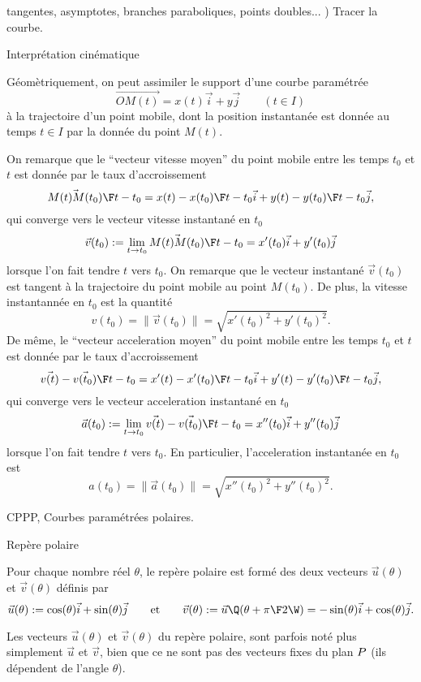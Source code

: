 \noindent\quad tangentes, asymptotes, branches paraboliques, points doubles...
\medskip
{}) Tracer la courbe.

\bigskip
\Concept [] Interpr\'etation cin\'ematique

\noindent
G\'eom\`etriquement, on peut assimiler le support d'une courbe param\'etr\'ee
$$
\vec{OM(t)}=x(t)\vec i+y\vec j\qquad(t\in I)
$$
\`a la trajectoire d'un point mobile, dont la position instantan\'ee est donn\'ee au temps $t\in I$ par la donn\'ee du point $M(t)$. 

\bigskip
\noindent
On remarque que le ``vecteur vitesse moyen'' du point mobile entre les temps $t_0$ et $t$ est donn\'ee par le taux d'accroissement 
$$
{\vec{M(t)M(t_0)}\F t-t_0}={x(t)-x(t_0)\F t-t_0}\vec i+{y(t)-y(t_0)\F t-t_0}\vec j, 
$$
qui converge vers le vecteur vitesse instantan\'e en $t_0$ 
$$
\vec v(t_0):=\lim_{t\to t_0}{\vec{M(t)M(t_0)}\F t-t_0}=x'(t_0)\vec i+y'(t_0)\vec j 
$$
lorsque l'on fait tendre $t$ vers $t_0$. \medskip
\noindent
On remarque que le vecteur instantan\'e $\vec v(t_0)$ est tangent \`a la trajectoire du point mobile au point $M(t_0)$. 
De plus, la vitesse instantann\'ee en $t_0$ est la quantit\'e 
$$
v(t_0)=\|\vec v(t_0)\|=\sqrt{x'(t_0)^2+y'(t_0)^2}.
$$
De m\^eme, le ``vecteur acceleration moyen'' du point mobile entre les temps $t_0$ et $t$ est donn\'ee par le taux d'accroissement 
$$
{\vec{v(t)}-\vec {v(t_0)}\F t-t_0}={x'(t)-x'(t_0)\F t-t_0}\vec i+{y'(t)-y'(t_0)\F t-t_0}\vec j, 
$$
qui converge vers le vecteur acceleration instantan\'e en $t_0$ 
$$
\vec a(t_0):=\lim_{t\to t_0}{\vec{v(t)}-\vec {v(t_0)}\F t-t_0}=x''(t_0)\vec i+y''(t_0)\vec j 
$$
lorsque l'on fait tendre $t$ vers $t_0$. En particulier, l'acceleration instantan\'ee en $t_0$ est 
$$
a(t_0)=\|\vec a(t_0)\|=\sqrt{x''(t_0)^2+y''(t_0)^2}.
$$
\bigskip

\Subsection CPPP, Courbes param\'etr\'ees polaires.

\Concept [] Rep\`ere polaire

\noindent
Pour chaque nombre r\'eel $\theta$, le rep\`ere polaire est form\'e des deux vecteurs $\vec u(\theta)$ et $\vec v(\theta)$ d\'efinis par 
$$
\vec u(\theta):=\cos(\theta)\vec i+\sin(\theta)\vec j\qquad\mbox{et}\qquad\vec v(\theta):=\vec u\Q(\theta+{\pi\F2}\W)=-\sin(\theta)\vec i+\cos(\theta)\vec j. 
$$

 Les vecteurs $\vec u(\theta)$ et $\vec v(\theta)$ du rep\`ere polaire, sont parfois not\'e plus simplement $\vec u$ et $\vec v$, bien que ce ne sont pas 
des vecteurs fixes du plan $\sc P$ (ils d\'ependent de l'angle $\theta$). 
\bigskip

